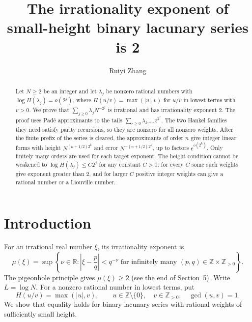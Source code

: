 \documentclass{amsart}
\numberwithin{equation}{section}
\newcommand{\Z}{\mathbb Z}
\newcommand{\R}{\mathbb R}
\begin{document}
\title[Small-height binary lacunary series]{The irrationality exponent of small-height binary lacunary series is 2}
\author{Ruiyi Zhang}
\address{Independent Researcher, Columbia, Maryland, USA}

\begin{abstract}
Let $N\ge2$ be an integer and let $\lambda_j$ be nonzero rational
numbers with $\log H(\lambda_j)=o(2^j)$, where $H(u/v)=\max(|u|,v)$
for $u/v$ in lowest terms with $v>0$. We prove that $\sum_{j\ge0}\lambda_jN^{-2^j}$ is irrational and
has irrationality exponent $2$. The proof uses Pad\'e approximants to
the tails $\sum_{r\ge0}\lambda_{k+r}z^{2^r}$. The two Hankel families
they need satisfy parity recursions, so they are nonzero for all nonzero
weights.
After the finite prefix of the series is cleared, the approximants of
order $n$ give integer linear forms with height
$N^{(n+1/2)2^k}$ and error $N^{-(n+1/2)2^k}$, up to factors
$e^{o(2^k)}$. Only finitely many orders are used for each target
exponent. The height condition cannot be weakened to
$\log H(\lambda_j)\le C2^j$ for any constant $C>0$: for every $C$ some
such weights give exponent greater than $2$, and for larger $C$
positive integer weights can give a rational number or a Liouville
number.
\end{abstract}

\maketitle

\section{Introduction}

For an irrational real number $\xi$, its irrationality exponent is
\[
\mu(\xi)=\sup\left\{\nu\in\R:
\left|\xi-\frac pq\right|<q^{-\nu}
\text{ for infinitely many }(p,q)\in\Z\times\Z_{>0}\right\}.
\]
The pigeonhole principle gives $\mu(\xi)\ge2$ (see the end of Section~5).
Write $L=\log N$.
For a nonzero rational number in lowest terms, put
\begin{equation}\label{eq:rationalheight}
H(u/v)=\max(|u|,v),\qquad u\in\Z\setminus\{0\},\quad
v\in\Z_{>0},\quad \gcd(u,v)=1.
\end{equation}
We show that equality holds for binary lacunary series with rational
weights of sufficiently small height.
\end{document}
